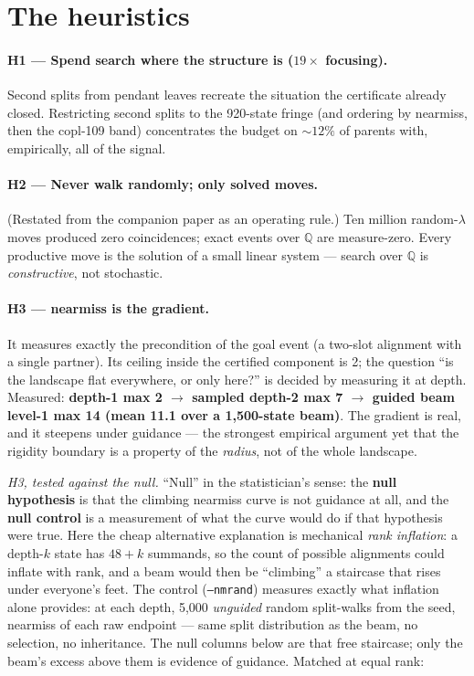 \documentclass[10pt]{article}
\begin{document}
\section{The heuristics}\label{sec:heur}

\paragraph{H1 --- Spend search where the structure is ($19\times$
focusing).} Second splits from pendant leaves recreate the situation
the certificate already closed. Restricting second splits to the
920-state fringe (and ordering by nearmiss, then the copl-109 band)
concentrates the budget on ${\sim}12\%$ of parents with, empirically,
all of the signal.

\paragraph{H2 --- Never walk randomly; only solved moves.} (Restated
from the companion paper as an operating rule.) Ten million
random-$\lambda$ moves produced zero coincidences; exact events over
$\mathbb{Q}$ are measure-zero. Every productive move is the solution
of a small linear system --- search over $\mathbb{Q}$ is
\emph{constructive}, not stochastic.

\paragraph{H3 --- nearmiss is the gradient.} It measures exactly the
precondition of the goal event (a two-slot alignment with a single
partner). Its ceiling inside the certified component is 2; the
question ``is the landscape flat everywhere, or only here?'' is
decided by measuring it at depth. Measured: \textbf{depth-1 max 2
$\to$ sampled depth-2 max 7 $\to$ guided beam level-1 max 14 (mean
11.1 over a 1{,}500-state beam)}. The gradient is real, and it
steepens under guidance --- the strongest empirical argument yet that
the rigidity boundary is a property of the \emph{radius}, not of the
whole landscape.

\medskip
\noindent\emph{H3, tested against the null.} ``Null'' in the
statistician's sense: the \textbf{null hypothesis} is that the
climbing nearmiss curve is not guidance at all, and the
\textbf{null control} is a measurement of what the curve would do
if that hypothesis were true. Here the cheap alternative explanation
is mechanical \emph{rank inflation}: a depth-$k$ state has
$48{+}k$ summands, so the count of possible alignments could inflate
with rank, and a beam would then be ``climbing'' a staircase that
rises under everyone's feet. The control (\texttt{--nmrand})
measures exactly what inflation alone provides: at each depth,
5{,}000 \emph{unguided} random split-walks from the seed, nearmiss
of each raw endpoint --- same split distribution as the beam, no
selection, no inheritance. The null columns below are that free
staircase; only the beam's excess above them is evidence of
guidance. Matched at equal rank:
\end{document}

